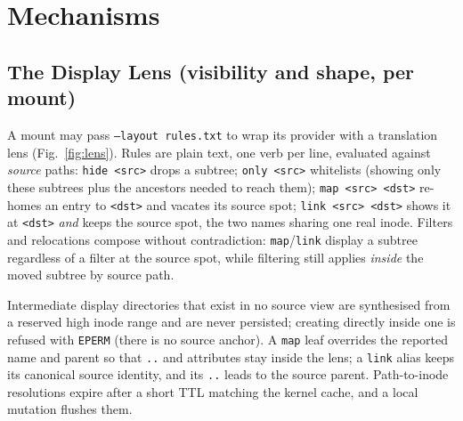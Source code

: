 \documentclass[numberedsection,acmtos]{acmart}
\begin{document}
\section{Mechanisms}
\label{sec:mechanisms}

\subsection{The Display Lens (visibility and shape, per mount)}\label{sec:lens}
A mount may pass \texttt{--layout rules.txt} to wrap its provider with a
translation lens (Fig.~\ref{fig:lens}). Rules are plain text, one verb per line, evaluated against
\emph{source} paths: \texttt{hide \textless src\textgreater} drops a subtree; \texttt{only \textless src\textgreater}
whitelists (showing only these subtrees plus the ancestors needed to reach
them); \texttt{map \textless src\textgreater{} \textless dst\textgreater{}} re-homes an entry to \texttt{\textless dst\textgreater{}} and vacates
its source spot; \texttt{link \textless src\textgreater{} \textless dst\textgreater{}} shows it at \texttt{\textless dst\textgreater{}} \emph{and}
keeps the source spot, the two names sharing one real inode. Filters and
relocations compose without contradiction: \texttt{map}/\texttt{link} display a
subtree regardless of a filter at the source spot, while filtering still
applies \emph{inside} the moved subtree by source path.

Intermediate display directories that exist in no source view are synthesised
from a reserved high inode range and are never persisted; creating directly
inside one is refused with \texttt{EPERM} (there is no source anchor). A
\texttt{map} leaf overrides the reported name and parent so that \texttt{..}
and attributes stay inside the lens; a \texttt{link} alias keeps its canonical
source identity, and its \texttt{..} leads to the source parent. Path-to-inode
resolutions expire after a short TTL matching the kernel cache, and a local
mutation flushes them.
\end{document}
